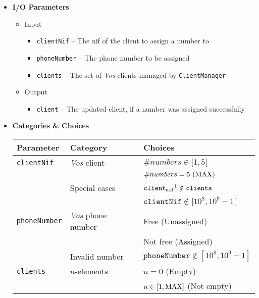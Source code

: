 \begin{itemize}
  \item \textbf{I/O Parameters}
  \begin{itemize}
    \normalsize
    \item Input
    \begin{itemize}
      \small
      \item \texttt{clientNif} -- The nif of the client to assign a number to
      \item \texttt{phoneNumber} -- The phone number to be assigned
      \item \texttt{clients} -- The set of \textit{Vos} clients managed by
            \texttt{ClientManager}
    \end{itemize}
    \item Output
    \begin{itemize}
      \item \texttt{client} -- The updated client, if a number was assigned
            successfully
    \end{itemize}
  \end{itemize}
  \clearpage

  \item \textbf{Categories \& Choices}
  \begin{table}[!hbtp]
    \centering
    \normalsize
    \begin{tabular}{|l|l|l|}
      \hline
      \textbf{Parameter} & \textbf{Category} & \textbf{Choices} \\ \hline
      \texttt{clientNif}
      & \textit{Vos} client
        & $\#numbers \in [1,5[$     \\ \cline{3-3}
      & & $\#numbers = 5\ (\rm{MAX})$ \\ \cline{2-3}
      & Special cases
        & $\texttt{client}_{\texttt{nif}}\footnotemark
           \notin \texttt{clients}$ \\ \cline{3-3}
      & & $\texttt{clientNif} \notin [10^8,10^9-1[$ \\ \hline
      \texttt{phoneNumber}
      & \textit{Vos} phone number
        & Free (Unassigned)   \\ \cline{3-3}
      & & Not free (Assigned) \\ \cline{2-3}
      & Invalid number
        & $\texttt{phoneNumber} \notin [10^8,10^9-1]$ \\ \hline
      \texttt{clients}
      & $n$-elements
        & $n = 0$ (Empty)                  \\ \cline{3-3}
      & & $n \in [1,\rm{MAX}]$ (Not empty) \\ \hline
    \end{tabular}
  \end{table}


\end{itemize}
